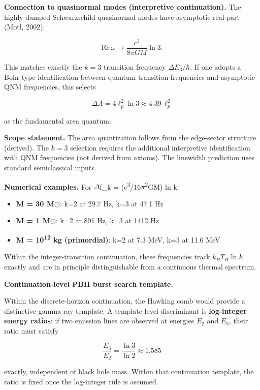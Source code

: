 \textbf{Connection to quasinormal modes (interpretive continuation).} The highly-damped Schwarzschild quasinormal modes have asymptotic real part (Motl, 2002):

\[
\mathrm{Re}\,\omega \to \frac{c^3}{8\pi G M} \ln 3.
\]

This matches exactly the \(k = 3\) transition frequency \(\Delta E_3 / \hbar\). If one adopts a Bohr-type identification between quantum transition frequencies and asymptotic QNM frequencies, this selects

\[
\Delta A = 4\ell_p^2 \ln 3 \approx 4.39 \, \ell_p^2
\]

as the fundamental area quantum.

\textbf{Scope statement.} The area quantization follows from the edge-sector structure (derived). The \(k = 3\) selection requires the additional interpretive identification with QNM frequencies (not derived from axioms). The linewidth prediction uses standard semiclassical inputs.

\textbf{Numerical examples.} For \ensuremath{\Delta}f\_k = (c\textsuperscript{3}/16\ensuremath{\pi}\textsuperscript{2}GM) ln k:

\begin{itemize}
\tightlist
\item
  \textbf{M = 30 M\ensuremath{\odot}}: k=2 at 29.7 Hz, k=3 at 47.1 Hz
\item
  \textbf{M = 1 M\ensuremath{\odot}}: k=2 at 891 Hz, k=3 at 1412 Hz
\item
  \textbf{M = 10\textsuperscript{1}\textsuperscript{2} kg (primordial)}: k=2 at 7.3 MeV, k=3 at 11.6 MeV
\end{itemize}

Within the integer-transition continuation, these frequencies track \(k_B T_H \ln k\) exactly and are in principle distinguishable from a continuous thermal spectrum.

\textbf{Continuation-level PBH burst search template.}

Within the discrete-horizon continuation, the Hawking comb would provide a distinctive gamma-ray template. A template-level discriminant is \textbf{log-integer energy ratios}: if two emission lines are observed at energies \(E_2\) and \(E_3\), their ratio must satisfy

\[
\frac{E_3}{E_2} = \frac{\ln 3}{\ln 2} \approx 1.585
\]

exactly, independent of black hole mass. Within that continuation template, the ratio is fixed once the log-integer rule is assumed.

